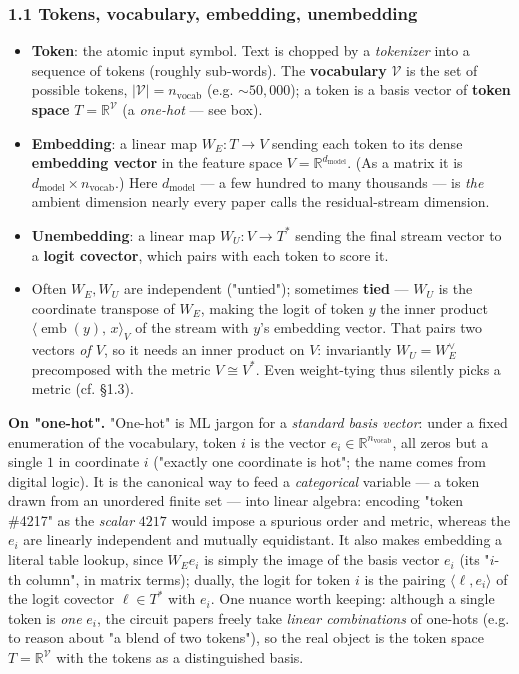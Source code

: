 \subsubsection*{1.1 Tokens, vocabulary, embedding, unembedding}
\begin{itemize}
\item \textbf{Token}: the atomic input symbol. Text is chopped by a \emph{tokenizer} into a sequence of tokens (roughly sub-words). The \textbf{vocabulary} $\mathcal V$ is the set of possible tokens, $|\mathcal V| = n_{\text{vocab}}$ (e.g. $\sim 50{,}000$); a token is a basis vector of \textbf{token space} $T = \mathbb{R}^{\mathcal V}$ (a \emph{one-hot} --- see box).
\item \textbf{Embedding}: a linear map $W_E : T \to V$ sending each token to its dense \textbf{embedding vector} in the feature space $V = \mathbb{R}^{d_{\text{model}}}$. (As a matrix it is $d_{\text{model}}\times n_{\text{vocab}}$.) Here $d_{\text{model}}$ --- a few hundred to many thousands --- is \emph{the} ambient dimension nearly every paper calls the residual-stream dimension.
\item \textbf{Unembedding}: a linear map $W_U : V \to T^{*}$ sending the final stream vector to a \textbf{logit covector}, which pairs with each token to score it.
\item Often $W_E, W_U$ are independent ("untied"); sometimes \textbf{tied} --- $W_U$ is the coordinate transpose of $W_E$, making the logit of token $y$ the inner product $\langle\operatorname{emb}(y),\,x\rangle_V$ of the stream with $y$'s embedding vector. That pairs two vectors \emph{of $V$}, so it needs an inner product on $V$: invariantly $W_U = W_E^{\vee}$ precomposed with the metric $V\cong V^{*}$. Even weight-tying thus silently picks a metric (cf. §1.3).
\end{itemize}

\begin{callout}
\textbf{On "one-hot".} "One-hot" is ML jargon for a \emph{standard basis vector}: under a fixed enumeration of the vocabulary, token $i$ is the vector $e_i \in \mathbb{R}^{n_{\text{vocab}}}$, all zeros but a single $1$ in coordinate $i$ ("exactly one coordinate is hot"; the name comes from digital logic). It is the canonical way to feed a \emph{categorical} variable --- a token drawn from an unordered finite set --- into linear algebra: encoding "token \#4217" as the \emph{scalar} $4217$ would impose a spurious order and metric, whereas the $e_i$ are linearly independent and mutually equidistant. It also makes embedding a literal table lookup, since $W_E e_i$ is simply the image of the basis vector $e_i$ (its "$i$-th column", in matrix terms); dually, the logit for token $i$ is the pairing $\langle \ell, e_i\rangle$ of the logit covector $\ell\in T^{*}$ with $e_i$. One nuance worth keeping: although a single token is \emph{one} $e_i$, the circuit papers freely take \emph{linear combinations} of one-hots (e.g. to reason about "a blend of two tokens"), so the real object is the token space $T = \mathbb{R}^{\mathcal V}$ with the tokens as a distinguished basis.

\end{callout}

